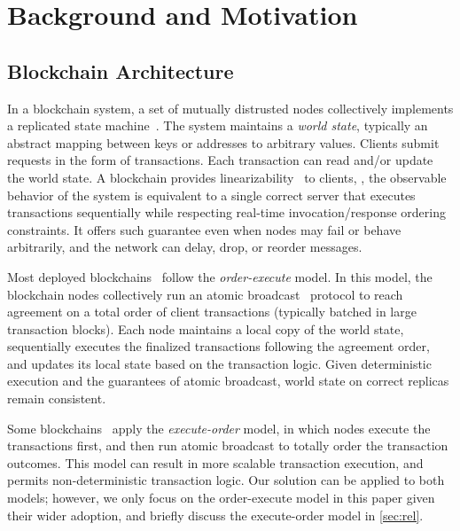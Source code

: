 \section{Background and Motivation}
\label{sec:bg}

\subsection{Blockchain Architecture}
\label{sec:bg:blockchain}

In a blockchain system, a set of mutually distrusted nodes collectively implements a replicated state machine~\cite{rsm}.
The system maintains a \emph{world state}, typically an abstract mapping between keys or addresses to arbitrary values.
Clients submit requests in the form of transactions.
Each transaction can read and/or update the world state.
A blockchain provides linearizability~\cite{linearizability} to clients, \ie, the observable behavior of the system is equivalent to a single correct server that executes transactions sequentially while respecting real-time invocation/response ordering constraints.
It offers such guarantee even when nodes may fail or behave arbitrarily, and the network can delay, drop, or reorder messages.

Most deployed blockchains~\cite{bitcoin,ethereum,algorand,sui} follow the \emph{order-execute} model.
In this model, the blockchain nodes collectively run an atomic broadcast~\cite{pbft,hotstuff,honeybadger,narwhal,bullshark} protocol to reach agreement on a total order of client transactions (typically batched in large transaction blocks).
Each node maintains a local copy of the world state, sequentially executes the finalized transactions following the agreement order, and updates its local state based on the transaction logic.
Given deterministic execution and the guarantees of atomic broadcast, world state on correct replicas remain consistent.

Some blockchains~\cite{hyperledger} apply the \emph{execute-order} model, in which nodes execute the transactions first, and then run atomic broadcast to totally order the transaction outcomes.
This model can result in more scalable transaction execution, and permits non-deterministic transaction logic.
Our solution can be applied to both models;
however, we only focus on the order-execute model in this paper given their wider adoption, and briefly discuss the execute-order model in \autoref{sec:rel}.

